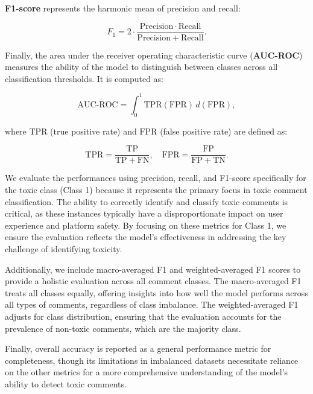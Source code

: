 \textbf{F1-score} represents the harmonic mean of precision and recall:

\begin{equation}
    F_1 = 2 \cdot \frac{\mathrm{Precision} \cdot \mathrm{Recall}}{\mathrm{Precision} + \mathrm{Recall}}.
\end{equation}

Finally, the area under the receiver operating characteristic curve (\textbf{AUC-ROC}) measures the ability of the model to distinguish between classes across all classification thresholds. It is computed as:

\begin{equation}
    \mathrm{AUC\text{-}ROC} = \int_{0}^{1} \mathrm{TPR}(\mathrm{FPR}) \, d(\mathrm{FPR}),
\end{equation}

where $\mathrm{TPR}$ (true positive rate) and $\mathrm{FPR}$ (false positive rate) are defined as:

\begin{equation}
        \mathrm{TPR} = \frac{\mathrm{TP}}{\mathrm{TP} + \mathrm{FN}}, \quad \mathrm{FPR} = \frac{\mathrm{FP}}{\mathrm{FP} + \mathrm{TN}}.
\end{equation}

We evaluate the performances using precision, recall, and F1-score specifically for the toxic class (Class 1) because it represents the primary focus in toxic comment classification. The ability to correctly identify and classify toxic comments is critical, as these instances typically have a disproportionate impact on user experience and platform safety. By focusing on these metrics for Class 1, we ensure the evaluation reflects the model's effectiveness in addressing the key challenge of identifying toxicity.

Additionally, we include macro-averaged F1 and weighted-averaged F1 scores to provide a holistic evaluation across all comment classes. The macro-averaged F1 treats all classes equally, offering insights into how well the model performs across all types of comments, regardless of class imbalance. The weighted-averaged F1 adjusts for class distribution, ensuring that the evaluation accounts for the prevalence of non-toxic comments, which are the majority class.

Finally, overall accuracy is reported as a general performance metric for completeness, though its limitations in imbalanced datasets necessitate reliance on the other metrics for a more comprehensive understanding of the model's ability to detect toxic comments.

